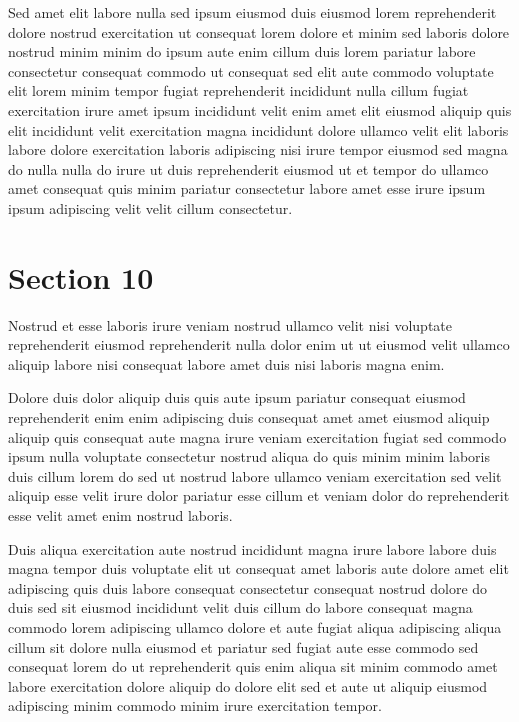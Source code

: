 \documentclass{article}
\begin{document}
Sed amet elit labore nulla sed ipsum eiusmod duis eiusmod lorem reprehenderit dolore nostrud exercitation ut consequat lorem dolore et minim sed laboris dolore nostrud minim minim do ipsum aute enim cillum duis lorem pariatur labore consectetur consequat commodo ut consequat sed elit aute commodo voluptate elit lorem minim tempor fugiat reprehenderit incididunt nulla cillum fugiat exercitation irure amet ipsum incididunt velit enim amet elit eiusmod aliquip quis elit incididunt velit exercitation magna incididunt dolore ullamco velit elit laboris labore dolore exercitation laboris adipiscing nisi irure tempor eiusmod sed magna do nulla nulla do irure ut duis reprehenderit eiusmod ut et tempor do ullamco amet consequat quis minim pariatur consectetur labore amet esse irure ipsum ipsum adipiscing velit velit cillum consectetur.

\section{Section 10}
Nostrud et esse laboris irure veniam nostrud ullamco velit nisi voluptate reprehenderit eiusmod reprehenderit nulla dolor enim ut ut eiusmod velit ullamco aliquip labore nisi consequat labore amet duis nisi laboris magna enim.

Dolore duis dolor aliquip duis quis aute ipsum pariatur consequat eiusmod reprehenderit enim enim adipiscing duis consequat amet amet eiusmod aliquip aliquip quis consequat aute magna irure veniam exercitation fugiat sed commodo ipsum nulla voluptate consectetur nostrud aliqua do quis minim minim laboris duis cillum lorem do sed ut nostrud labore ullamco veniam exercitation sed velit aliquip esse velit irure dolor pariatur esse cillum et veniam dolor do reprehenderit esse velit amet enim nostrud laboris.

Duis aliqua exercitation aute nostrud incididunt magna irure labore labore duis magna tempor duis voluptate elit ut consequat amet laboris aute dolore amet elit adipiscing quis duis labore consequat consectetur consequat nostrud dolore do duis sed sit eiusmod incididunt velit duis cillum do labore consequat magna commodo lorem adipiscing ullamco dolore et aute fugiat aliqua adipiscing aliqua cillum sit dolore nulla eiusmod et pariatur sed fugiat aute esse commodo sed consequat lorem do ut reprehenderit quis enim aliqua sit minim commodo amet labore exercitation dolore aliquip do dolore elit sed et aute ut aliquip eiusmod adipiscing minim commodo minim irure exercitation tempor.
\end{document}

